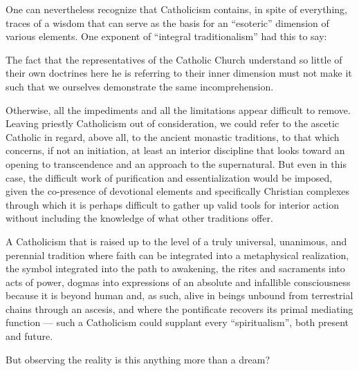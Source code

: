 One can nevertheless recognize that Catholicism contains, in spite of everything, traces of a wisdom that can serve as the basis for an ``esoteric'' dimension of various elements. One exponent of ``integral traditionalism'' had this to say:

\begin{quotex}
The fact that the representatives of the Catholic Church understand so little of their own doctrines here he is referring to their inner dimension must not make it such that we ourselves demonstrate the same incomprehension.
\end{quotex}


Otherwise, all the impediments and all the limitations appear difficult to remove. Leaving priestly Catholicism out of consideration, we could refer to the ascetic Catholic in regard, above all, to the ancient monastic traditions, to that which concerns, if not an initiation, at least an interior discipline that looks toward an opening to transcendence and an approach to the supernatural. But even in this case, the difficult work of purification and essentialization would be imposed, given the co-presence of devotional elements and specifically Christian complexes through which it is perhaps difficult to gather up valid tools for interior action without including the knowledge of what other traditions offer.

A Catholicism that is raised up to the level of a truly universal, unanimous, and perennial tradition where faith can be integrated into a metaphysical realization, the symbol integrated into the path to awakening, the rites and sacraments into acts of power, dogmas into expressions of an absolute and infallible consciousness because it is beyond human and, as such, alive in beings unbound from terrestrial chains through an ascesis, and where the pontificate recovers its primal mediating function --- such a Catholicism could supplant every ``spiritualism'', both present and future.

But observing the reality is this anything more than a dream?



